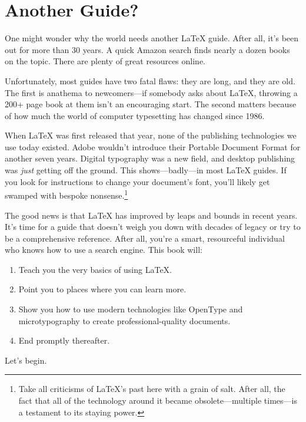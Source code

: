 \section{Another Guide?}

One might wonder why the world needs another \LaTeX{} guide.
After all, it's been out for more than 30 years.
A quick Amazon search finds nearly a dozen books on the topic.
There are plenty of great resources online.

Unfortunately, most guides have two fatal flaws: they are long,
and they are old.
The first is anathema to newcomers---if somebody asks about \LaTeX{},
throwing a 200+ page book at them isn't an encouraging start.
The second matters because of how much the world of computer typesetting has
changed since 1986.

When \LaTeX{} was first released that year, none of the publishing technologies
we use today existed.
Adobe wouldn't introduce their Portable Document Format for another seven years.
Digital typography was a new field, and desktop publishing was \emph{just}
getting off the ground.\punckern{}
This shows---badly---in most \LaTeX{} guides.
If you look for instructions to change your document's font,
you'll likely get swamped with bespoke nonsense.\punckern\footnote{%
Take all criticisms of \LaTeX's past here with a grain of
salt. After all, the fact that all of the technology around it became
obsolete---multiple times---is a testament to its staying power.}

The good news is that  \LaTeX{} has improved by leaps and bounds in recent years.
It's time for a guide that doesn't weigh you down with decades of legacy
or try to be a comprehensive reference.
After all, you're a smart, resourceful individual who knows how to use a search
engine.
This book will:
\begin{enumerate}
\item Teach you the very basics of using \LaTeX.
\item Point you to places where you can learn more.
\item Show you how to use modern technologies like OpenType and microtypography
    to create professional-quality documents.
\item End promptly thereafter.
\end{enumerate}
Let's begin.
